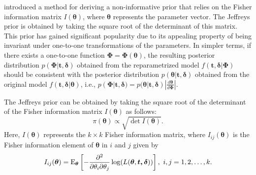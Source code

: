  \cite{jeffreys1946invariant} introduced a method for deriving a non-informative prior that relies on the Fisher information matrix $I(\boldsymbol{\theta})$, where $\boldsymbol{\theta}$ represents the parameter vector. The Jeffreys prior is obtained by taking the square root of the determinant of this matrix. This prior has gained significant popularity due to its appealing property of being invariant under one-to-one transformations of the parameters. In simpler terms, if there exists a one-to-one function $\boldsymbol{\Phi}=\boldsymbol{\Phi}(\boldsymbol{\theta})$, the resulting posterior distribution $p(\boldsymbol{\Phi}|\boldsymbol{t,\delta})$ obtained from the reparametrized model $f(\boldsymbol{t,\delta}|\boldsymbol{\Phi})$ should be consistent with the posterior distribution $p(\boldsymbol{\theta}|\boldsymbol{t,\delta})$ obtained from the original model $f(\boldsymbol{t,\delta}|\boldsymbol{\theta})$, i.e., $p(\boldsymbol{\Phi}|\boldsymbol{t,\delta})=p(\boldsymbol{\theta}|\boldsymbol{t,\delta})|\frac{d\boldsymbol{\theta}}{d\boldsymbol{\Phi}}|$.

The Jeffreys prior can be obtained by taking the square root of the determinant of the Fisher information matrix $I(\boldsymbol{\theta})$ as follows:
\begin{equation}\label{jeffreysp} 
\pi(\boldsymbol{\theta})\propto \sqrt{\det I(\boldsymbol{\theta})}.
\end{equation}
Here, $I(\boldsymbol{\theta})$ represents the $k\times k$ Fisher information matrix, where $I_{ij}(\boldsymbol{\theta})$ is the Fisher information element of $\boldsymbol{\theta}$ in $i$ and $j$  given by
\begin{equation*}%
I_{ij}(\boldsymbol{\theta})=\f{E}_{\boldsymbol{\theta}}\left[-\frac{\partial^2}{\partial \theta_i \partial \theta_j}\log(L(\boldsymbol{\theta},\boldsymbol{t,\delta}))\right],\ i,j=1,2,\ldots,k.
\end{equation*}

